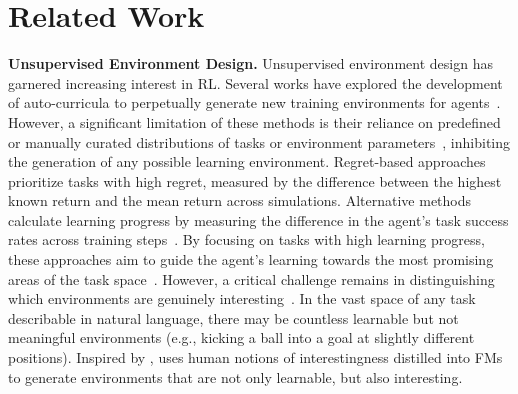 \documentclass{article} %
\begin{document}
\vspace{-4pt}
\section{Related Work}
\label{sec:related-work}
\vspace{-4pt}

\textbf{Unsupervised Environment Design.}
%
Unsupervised environment design has garnered increasing interest in RL. Several works have explored the development of auto-curricula to perpetually generate new training environments for agents~\citep{dennis_EmergentComplexityZeroshot_2020, jiang_PrioritizedLevelReplay_2021, parker-holder_EvolvingCurriculaRegretBased_2022, samvelyan_MAESTROOpenEndedEnvironment_2022, wang_PairedOpenEndedTrailblazer_2019, wang_EnhancedPOETOpenended_2020}. However, a significant limitation of these methods is their reliance on predefined or manually curated distributions of tasks or environment parameters~\citep{dennis_EmergentComplexityZeroshot_2020, heess_EmergenceLocomotionBehaviours_2017, jiang_PrioritizedLevelReplay_2021, parker-holder_EvolvingCurriculaRegretBased_2022, samvelyan_MAESTROOpenEndedEnvironment_2022, wang_PairedOpenEndedTrailblazer_2019, wang_EnhancedPOETOpenended_2020}, inhibiting the generation of any possible learning environment.
Regret-based approaches~\citep{jiang_PrioritizedLevelReplay_2021, parker-holder_EvolvingCurriculaRegretBased_2022, samvelyan_MAESTROOpenEndedEnvironment_2022} prioritize tasks with high regret, measured by the difference between the highest known return and the mean return across simulations. Alternative methods calculate learning progress by measuring the difference in the agent's task success rates across training steps~\citep{kanitscheider2021multi}. By focusing on tasks with high learning progress, these approaches aim to guide the agent's learning towards the most promising areas of the task space~\citep{oudeyer2007intrinsic, oudeyer2007intrinsicm, baranes2013active}.
However, a critical challenge remains in distinguishing which environments are genuinely interesting~\citep{jiang_GeneralIntelligenceRequires_2022, zhang_OMNIOpenendednessModels_2023, colas2022autotelic}. In the vast space of any task describable in natural language, there may be countless learnable but not meaningful environments (e.g., kicking a ball into a goal at slightly different positions). Inspired by \citet{zhang_OMNIOpenendednessModels_2023}, \ours{} uses human notions of interestingness distilled into FMs to generate environments that are not only learnable, but also interesting.
\end{document}

